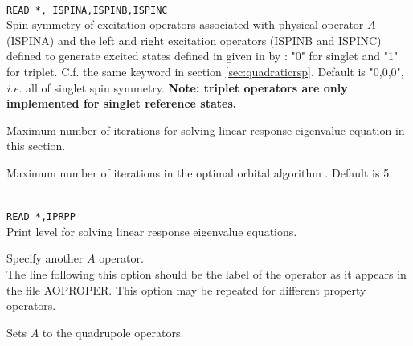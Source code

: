 \begin{description}
\item{}\\
\verb|READ *, ISPINA,ISPINB,ISPINC|\\
Spin symmetry of excitation operators associated with physical operator $A$ (ISPINA)
and the left and right excitation operators (ISPINB and ISPINC) defined to
generate excited states defined in  given in by :
"0" for singlet and "1" for triplet.
C.f. the same keyword in section \ref{sec:quadraticrsp}.
Default is "0,0,0", {\it i.e.\/} all of singlet spin symmetry.
{\bf Note: triplet operators are only implemented for singlet reference states.}

\item{}
Maximum number of iterations for solving linear response
eigenvalue equation in this section.

\item{}
Maximum number of iterations in the optimal
orbital algorithm
\cite{tuhjahjajpjjcp84}.
Default is 5.

\item{}\\
\verb|READ *,IPRPP|\\
Print level for solving linear response eigenvalue equations.

\item{}
Specify another $A$ operator. \\
The line following this
option should be the label of the operator as it appears in the file
AOPROPER. This option may be repeated for different property operators.

\item{}
Sets $A$ to the quadrupole operators.


\end{description}
